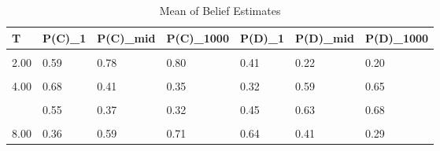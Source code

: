 \begin{table}[!h]
\centering
\caption{Mean of Belief Estimates}
\centering
\begin{tabular}[t]{lllllll}
\toprule
T & P(C)\_1 & P(C)\_mid & P(C)\_1000 & P(D)\_1 & P(D)\_mid & P(D)\_1000\\
\midrule
\cellcolor{gray!10}{1.00} & \cellcolor{gray!10}{0.69} & \cellcolor{gray!10}{0.93} & \cellcolor{gray!10}{0.94} & \cellcolor{gray!10}{0.31} & \cellcolor{gray!10}{0.07} & \cellcolor{gray!10}{0.06}\\
2.00 & 0.59 & 0.78 & 0.80 & 0.41 & 0.22 & 0.20\\
\cellcolor{gray!10}{3.00} & \cellcolor{gray!10}{0.55} & \cellcolor{gray!10}{0.24} & \cellcolor{gray!10}{0.25} & \cellcolor{gray!10}{0.45} & \cellcolor{gray!10}{0.76} & \cellcolor{gray!10}{0.75}\\
4.00 & 0.68 & 0.41 & 0.35 & 0.32 & 0.59 & 0.65\\
\cellcolor{gray!10}{5.00} & \cellcolor{gray!10}{0.60} & \cellcolor{gray!10}{0.40} & \cellcolor{gray!10}{0.31} & \cellcolor{gray!10}{0.40} & \cellcolor{gray!10}{0.60} & \cellcolor{gray!10}{0.69}\\
\addlinespace
6.00 & 0.55 & 0.37 & 0.32 & 0.45 & 0.63 & 0.68\\
\cellcolor{gray!10}{7.00} & \cellcolor{gray!10}{0.41} & \cellcolor{gray!10}{0.57} & \cellcolor{gray!10}{0.69} & \cellcolor{gray!10}{0.59} & \cellcolor{gray!10}{0.43} & \cellcolor{gray!10}{0.31}\\
8.00 & 0.36 & 0.59 & 0.71 & 0.64 & 0.41 & 0.29\\
\bottomrule
\end{tabular}
\end{table}